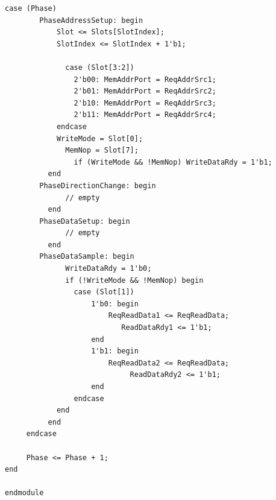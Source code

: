 \documentclass[12pt, a4paper]{article}
\begin{document}
\begin{lstlisting}[style=prettyverilog,caption={Moduł vmmu.v}]
	 case (Phase)
        PhaseAddressSetup: begin
            Slot <= Slots[SlotIndex];
            SlotIndex <= SlotIndex + 1'b1;

		      case (Slot[3:2])
                2'b00: MemAddrPort = ReqAddrSrc1;
                2'b01: MemAddrPort = ReqAddrSrc2;
                2'b10: MemAddrPort = ReqAddrSrc3;
                2'b11: MemAddrPort = ReqAddrSrc4;
            endcase
            WriteMode = Slot[0];
		      MemNop = Slot[7];
				if (WriteMode && !MemNop) WriteDataRdy = 1'b1;
		  end
        PhaseDirectionChange: begin
		      // empty
		  end
        PhaseDataSetup: begin
		      // empty
		  end
        PhaseDataSample: begin
		      WriteDataRdy = 1'b0;
		      if (!WriteMode && !MemNop) begin
                case (Slot[1])
                    1'b0: begin
                        ReqReadData1 <= ReqReadData;
			               ReadDataRdy1 <= 1'b1;
                    end
                    1'b1: begin
                        ReqReadData2 <= ReqReadData;
					         ReadDataRdy2 <= 1'b1;
                    end
                endcase
            end
		  end
	 endcase
	 
	 Phase <= Phase + 1;
end
    
endmodule
\end{lstlisting}
\end{document}
